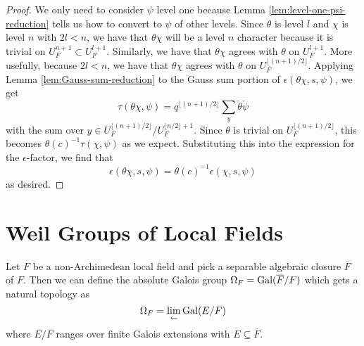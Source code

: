 \begin{proof}
  We only need to consider $\psi$ level one because Lemma \ref{lem:level-one-psi-reduction} tells us how to convert to $\psi$ of other levels.
  Since $\theta$ is level $l$ and $\chi$ is level $n$ with $2l < n$, we have that $\theta\chi$ will be a level $n$ character because it is trivial on $U_F^{n+1} \subset U_F^{l+1}$.
  Similarly, we have that $\theta \chi$ agrees with $\theta$ on $U_F^{l+1}$.
  More usefully, because $2l < n$, we have that $\theta \chi$ agrees with $\theta$ on $U_F^{\lfloor (n+1)/2 \rfloor}$.
  Applying Lemma \ref{lem:Gauss-sum-reduction} to the Gauss sum portion of $\epsilon(\theta\chi,s,\psi)$, we get
  \[\tau(\theta \chi, \psi) = q^{\lfloor (n+1)/2\rfloor} \sum_y \check{\theta}\check{\psi}\]
  with the sum over $y \in U_F^{\lfloor (n+1)/2 \rfloor}/U_F^{\lfloor n/2 \rfloor + 1}$.
  Since $\theta$ is trivial on $U_F^{\lfloor (n+1)/2 \rfloor}$, this becomes $\theta(c)^{-1} \tau(\chi, \psi)$ as we expect.
  Substituting this into the expression for the $\epsilon$-factor, we find that
  \[\epsilon(\theta\chi, s, \psi) = \theta(c)^{-1} \epsilon(\chi, s, \psi)\]
  as desired.
\end{proof}



\section{Weil Groups of Local Fields}
\label{sec:weil-group}
Let $F$ be a non-Archimedean local field and pick a separable algebraic closure $\overline{F}$ of $F$.
Then we can define the absolute Galois group $\Omega_F = \textrm{Gal}(\overline{F}/F)$ which gets a natural topology as
\[\Omega_F = \lim_{\leftarrow} \textrm{Gal}(E/F)\]
where $E/F$ ranges over finite Galois extensions with $E \subseteq \overline{F}$.

